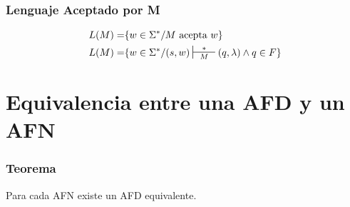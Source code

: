 \subsubsection{Lenguaje Aceptado por M}
\begin{align*}
L(M) = & \{ w\in\Sigma^* / M \text{ acepta } w\} \\
L(M) = & \{ w\in\Sigma^* / (s,w) \sststile{M}{\hspace{0.25cm} * \hspace{0.25cm}} (q,\lambda) \wedge q\in F\}
\end{align*}
\section{Equivalencia entre una AFD y un AFN}
\subsubsection{Teorema}
Para cada AFN existe un AFD equivalente.
